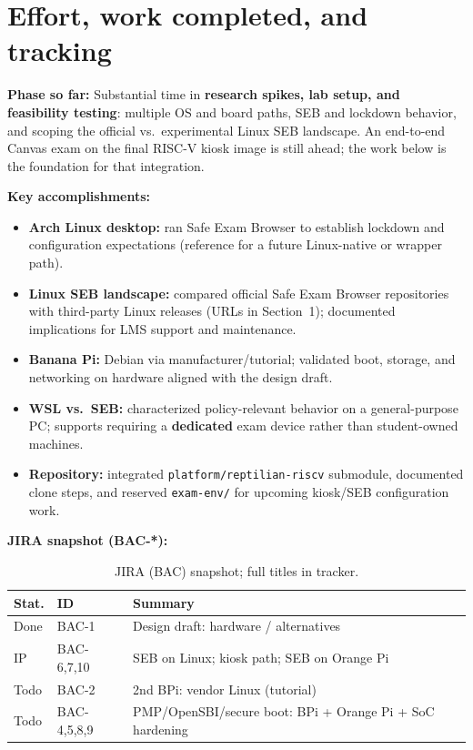 \documentclass[10pt]{article}
\begin{document}
\section{Effort, work completed, and tracking}

\noindent\textbf{Phase so far:} Substantial time in \textbf{research spikes, lab setup, and feasibility testing}: multiple OS and board paths, SEB and lockdown behavior, and scoping the official vs.\ experimental Linux SEB landscape. An end-to-end Canvas exam on the final RISC-V kiosk image is still ahead; the work below is the foundation for that integration.

\noindent\textbf{Key accomplishments:}
\begin{itemize}\setlength{\itemsep}{0.12em}
  \item \textbf{Arch Linux desktop:} ran Safe Exam Browser to establish lockdown and configuration expectations (reference for a future Linux-native or wrapper path).
  \item \textbf{Linux SEB landscape:} compared official Safe Exam Browser repositories with third-party Linux releases (URLs in Section~1); documented implications for LMS support and maintenance.
  \item \textbf{Banana Pi:} Debian via manufacturer/tutorial; validated boot, storage, and networking on hardware aligned with the design draft.
  \item \textbf{WSL vs.\ SEB:} characterized policy-relevant behavior on a general-purpose PC; supports requiring a \textbf{dedicated} exam device rather than student-owned machines.
  \item \textbf{Repository:} integrated \texttt{platform/reptilian-riscv} submodule, documented clone steps, and reserved \texttt{exam-env/} for upcoming kiosk/SEB configuration work.
\end{itemize}

\noindent\textbf{JIRA snapshot (BAC-*):}

\begin{table}[H]
  \centering
  \scriptsize
  \setlength{\tabcolsep}{2pt}
  \begin{tabularx}{\textwidth}{@{}p{}lX@{}}
    \toprule
    \textbf{Stat.} & \textbf{ID} & \textbf{Summary} \\
    \midrule
    Done & BAC-1 & Design draft: hardware / alternatives \\
    IP & BAC-6,7,10 & SEB on Linux; kiosk path; SEB on Orange Pi \\
    Todo & BAC-2 & 2nd BPi: vendor Linux (tutorial) \\
    Todo & BAC-4,5,8,9 & PMP/OpenSBI/secure boot: BPi + Orange Pi + SoC hardening \\
    \bottomrule
  \end{tabularx}
  \caption{JIRA (BAC) snapshot; full titles in tracker.}
\end{table}
\end{document}
